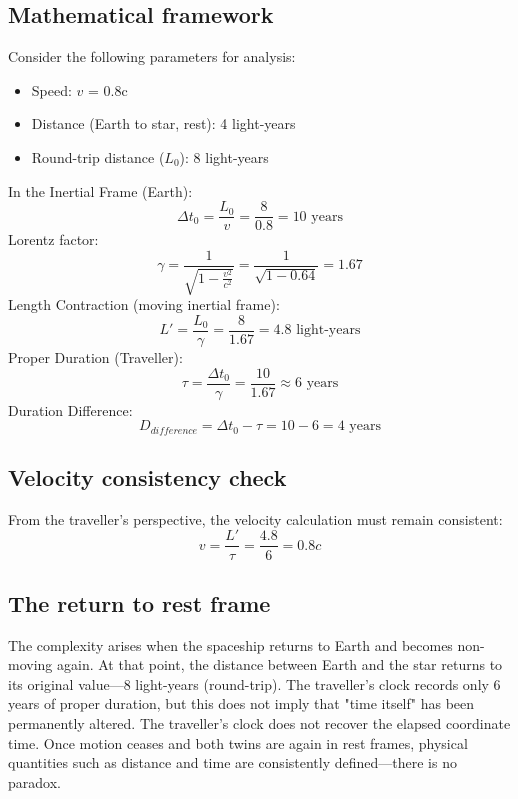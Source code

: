 \documentclass[pdflatex,sn-basic]{sn-jnl}
\theoremstyle{thmstyleone}%
\theoremstyle{thmstyletwo}%
\theoremstyle{thmstylethree}%
\begin{document}
	\subsection{Mathematical framework}\label{subsec3_3}
Consider the following parameters for analysis:
		\begin{itemize}
			\item Speed: $v$ = 0.8c
			\item Distance (Earth to star, rest): 4 light-years
			\item Round-trip distance ($L_0$): 8 light-years
		\end{itemize}
In the Inertial Frame (Earth):
		\begin{equation*}
  			\Delta t_0 = \frac{L_0}{v} = \frac{8}{0.8} = 10 \text{ years}
		\end{equation*}
Lorentz factor:
		\begin{equation*}
  			\gamma = \frac{1}{\sqrt{1 - \frac{v^2}{c^2}}} = \frac{1}{\sqrt{1 - 0.64}} = 1.67
		\end{equation*}
Length Contraction (moving inertial frame):
		\begin{equation*}
  			L' = \frac{L_0}{\gamma} = \frac{8}{1.67} = 4.8 \text{ light-years}
		\end{equation*}
Proper Duration (Traveller):
		\begin{equation*}
  			\tau = \frac{\Delta t_0}{\gamma} = \frac{10}{1.67} \approx 6 \text{ years}
		\end{equation*}
Duration Difference:
		\begin{equation*}
  			D_{difference} = \Delta t_0 - \tau = 10 - 6 = 4 \text{ years}
		\end{equation*}
	\subsection{Velocity consistency check}\label{subsec3_4}
		From the traveller's perspective, the velocity calculation must remain consistent:
		\begin{equation*}
  			v = \frac{L'}{\tau} = \frac{4.8}{6} = 0.8c
		\end{equation*}
	\subsection{The return to rest frame}\label{subsec3_5}
The complexity arises when the spaceship returns to Earth and becomes non-moving again. At that point, the distance between Earth and the star returns to its original value—8 light-years (round-trip). The traveller's clock records only 6 years of proper duration, but this does not imply that "time itself" has been permanently altered. The traveller's clock does not recover the elapsed coordinate time. Once motion ceases and both twins are again in rest frames, physical quantities such as distance and time are consistently defined—there is no paradox.
\end{document}
